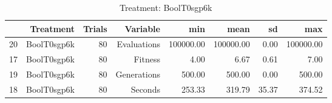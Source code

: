 \begin{table}[ht]
\centering
\begin{tabular}{rrrrrrrr}
  \hline
 & Treatment & Trials & Variable & min & mean & sd & max \\ 
  \hline
20 & BoolT0sgp6k &  80 & Evaluations & 100000.00 & 100000.00 & 0.00 & 100000.00 \\ 
  17 & BoolT0sgp6k &  80 & Fitness & 4.00 & 6.67 & 0.61 & 7.00 \\ 
  19 & BoolT0sgp6k &  80 & Generations & 500.00 & 500.00 & 0.00 & 500.00 \\ 
  18 & BoolT0sgp6k &  80 & Seconds & 253.33 & 319.79 & 35.37 & 374.52 \\ 
   \hline
\end{tabular}
\caption{Treatment: BoolT0sgp6k} 
\end{table}
